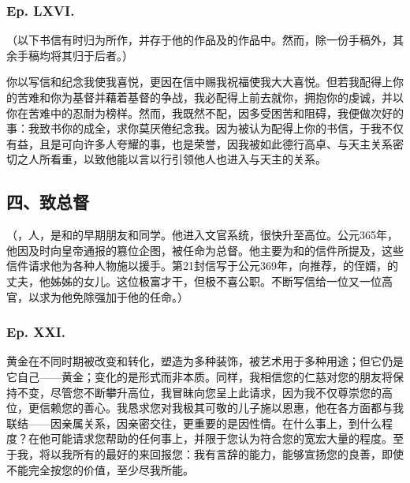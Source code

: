
\subsubsection{Ep. LXVI.}

（以下书信有时归为所作，并存于他的作品及的作品中。然而，除一份手稿外，其余手稿均将其归于后者。）\par

你以写信和纪念我使我喜悦，更因在信中赐我祝福使我大大喜悦。但若我配得上你的苦难和你为基督并藉着基督的争战，我必配得上前去就你，拥抱你的虔诚，并以你在苦难中的忍耐为榜样。然而，我既然不配，因多受困苦和阻碍，我便做次好的事：我致书你的成全，求你莫厌倦纪念我。因为被认为配得上你的书信，于我不仅有益，且是可向许多人夸耀的事，也是荣誉，因我被如此德行高卓、与天主关系密切之人所看重，以致他能以言以行引领他人也进入与天主的关系。\par


\subsection{四、致总督}

（，人，是和的早期朋友和同学。他进入文官系统，很快升至高位。公元365年，他因及时向皇帝通报的篡位企图，被任命为总督。他主要为和的信件所提及，这些信件请求他为各种人物施以援手。第21封信写于公元369年，向推荐，的侄婿，的丈夫，他姊姊的女儿。这位极富才干，但极不喜公职。不断写信给一位又一位高官，以求为他免除强加于他的任命。）\par


\subsubsection{Ep. XXI.}

黄金在不同时期被改变和转化，塑造为多种装饰，被艺术用于多种用途；但它仍是它自己——黄金；变化的是形式而非本质。同样，我相信您的仁慈对您的朋友将保持不变，尽管您不断攀升高位，我冒昧向您呈上此请求，因为我不仅尊崇您的高位，更信赖您的善心。我恳求您对我极其可敬的儿子施以恩惠，他在各方面都与我联结——因亲属关系，因亲密交往，更重要的是因性情。在什么事上，到什么程度？在他可能请求您帮助的任何事上，并限于您认为符合您的宽宏大量的程度。至于我，将以我所有的最好的来回报您：我有言辞的能力，能够宣扬您的良善，即使不能完全按您的价值，至少尽我所能。\par

